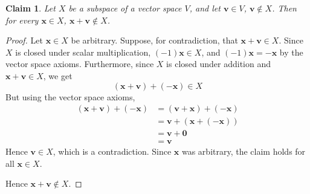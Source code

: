 \documentclass{article}
\newtheorem*{claim}{Claim}
\begin{document}
\begin{claim}
    Let $X$ be a subspace of a vector space $V$, and let $\mathbf{v} \in V$, $\mathbf{v} \notin X$. Then 
    for every $\mathbf{x} \in X$, $\mathbf{x} + \mathbf{v} \notin X$.
\end{claim}

\begin{proof}
    Let $\mathbf{x} \in X$ be arbitrary. Suppose, for contradiction, that $\mathbf{x} + \mathbf{v} \in X$. 
    Since $X$ is closed under scalar multiplication, $(-1)\mathbf{x} \in X$, and 
    $(-1)\mathbf{x} = -\mathbf{x}$ by the vector space axioms. Furthermore, since $X$ is closed under 
    addition and $\mathbf{x} + \mathbf{v} \in X$, we get
    \[
    (\mathbf{x} + \mathbf{v}) + (-\mathbf{x}) \in X
    \]
    But using the vector space axioms, 
    \[
    \begin{aligned}
        (\mathbf{x} + \mathbf{v}) + (-\mathbf{x}) &= (\mathbf{v} + \mathbf{x}) + (-\mathbf{x}) \\
        &= \mathbf{v} + (\mathbf{x} + (-\mathbf{x})) \\
        &= \mathbf{v} + \mathbf{0} \\
        &= \mathbf{v}
    \end{aligned}
    \]
    Hence $\mathbf{v} \in X$, which is a contradiction. Since $\mathbf{x}$ was arbitrary, the claim holds 
    for all $\mathbf{x} \in X$.

    \medskip

    Hence $\mathbf{x} + \mathbf{v} \notin X$.
\end{proof}
\end{document}
